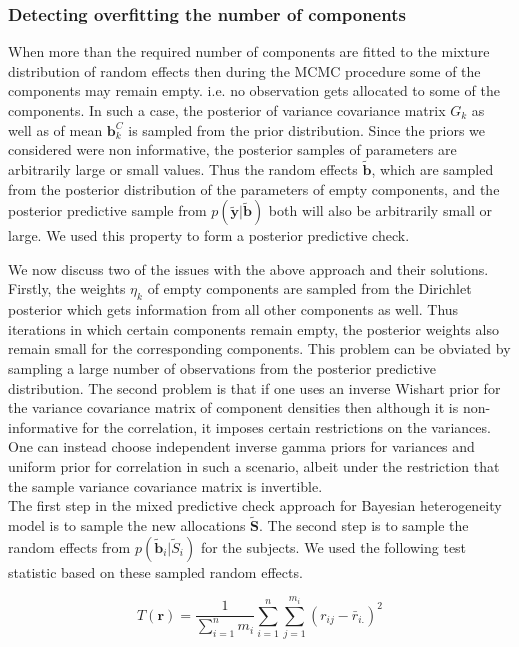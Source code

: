 \subsubsection{Detecting overfitting the number of components}
When more than the required number of components are fitted to the mixture distribution of random effects then  during the MCMC procedure some of the components may remain empty. i.e. no observation gets allocated to some of the components. In such a case, the posterior of variance covariance matrix $G_k$ as well as of mean $\boldsymbol{b}_k^C$ is sampled from the prior distribution. Since the priors we considered were non informative, the posterior samples of parameters are arbitrarily large or small values. Thus the random effects $\boldsymbol{\tilde{b}}$, which are sampled from the posterior distribution of the parameters of empty components, and the posterior predictive sample from $p(\boldsymbol{\tilde{y}} | \boldsymbol{\tilde{b}})$ both will also be arbitrarily small or large. We used this property to form a posterior predictive check.

We now discuss two of the issues with the above approach and their solutions. Firstly, the weights $\eta_k$ of empty components are sampled from the Dirichlet posterior which gets information from all other components as well. Thus iterations in which certain components remain empty, the posterior weights also remain small for the corresponding components. This problem can be obviated by sampling a large number of observations from the posterior predictive distribution. The second problem is that if one uses an inverse Wishart prior for the variance covariance matrix of component densities then although it is non-informative for the correlation, it imposes certain restrictions on the variances. One can instead choose independent inverse gamma priors for variances and uniform prior for correlation in such a scenario, albeit under the restriction that the sample variance covariance matrix is invertible.\\

 The first step in the mixed predictive check approach for Bayesian heterogeneity model is to sample the new allocations $\boldsymbol{\tilde{S}}$. The second step is to sample the random effects from $p(\boldsymbol{\tilde{b}}_i|\tilde{S}_i)$ for the subjects. We used the following test statistic based on these sampled random effects.

\begin{equation}
\label{eq : ppc_test_statistic}
T(\boldsymbol{r}) = \frac 1 {\sum_{i=1}^n m_i} \sum_{i=1}^n \sum_{j=1}^{m_i} {(r_{ij}-\bar{r}_{i.})}^2
\end{equation}

